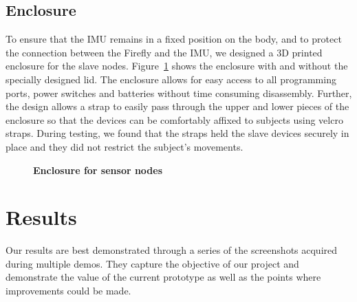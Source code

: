 \documentclass[conference]{IEEEtran}
\begin{document}
\subsection{Enclosure} 
To ensure that the IMU remains in a fixed position on the body, and to protect the
connection between the Firefly and the IMU, we designed a 3D printed enclosure for the
slave nodes. Figure~\ref{fig:box} shows the enclosure with and without the specially designed
lid. The enclosure allows for easy access to all programming ports, power switches and
batteries without time consuming disassembly. Further, the design allows a strap to easily
pass through the upper and lower pieces of the enclosure so that the devices can be
comfortably affixed to subjects using velcro straps. During testing, we found that the
straps held the slave devices securely in place and they did not restrict the subject's
movements. 
\begin{figure}[h]
  \centering
  \label{fig:box}
  \caption{{\bf Enclosure for sensor nodes}}
\end{figure}

\section{Results}
Our results are best demonstrated through a series of the screenshots acquired during
multiple demos. They capture the objective of our project and demonstrate the value of the
current prototype as well as the points where improvements could be made. 
\end{document}
